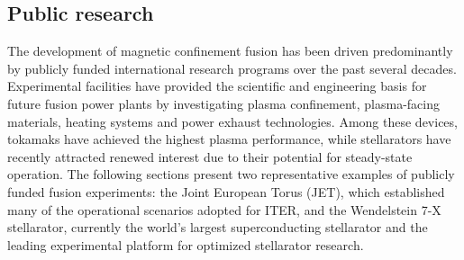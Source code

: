 \documentclass[a4paper]{article}
\begin{document}
\subsection{Public research}
The development of magnetic confinement fusion has been driven predominantly by publicly funded international research programs over the past several decades.
Experimental facilities have provided the scientific and engineering basis for future fusion power plants by investigating plasma confinement, plasma-facing materials, heating systems and power exhaust technologies.
Among these devices, tokamaks have achieved the highest plasma performance, while stellarators have recently attracted renewed interest due to their potential for steady-state operation.
The following sections present two representative examples of publicly funded fusion experiments: the Joint European Torus (JET), which established many of the operational scenarios adopted for ITER, and the Wendelstein 7-X stellarator, currently the world's largest superconducting stellarator and the leading experimental platform for optimized stellarator research.
\end{document}
